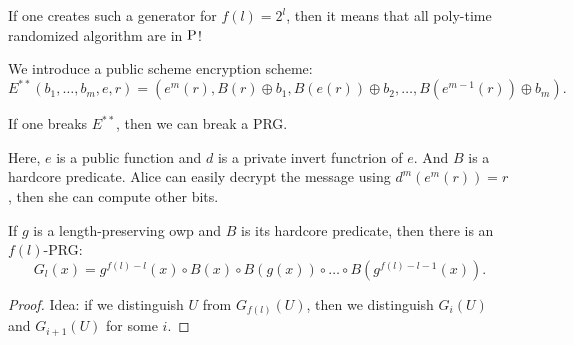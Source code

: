 If one creates such a generator for $f(l) = 2^{l}$, then it means that all poly-time randomized algorithm are in $\operatorname{P}$! 

We introduce a public scheme encryption scheme:
\[
E^{**}(b_1, \ldots, b_m, e, r) = (e^{m}(r), B(r) \oplus b_1, B(e(r)) \oplus b_2, \ldots, B(e^{m - 1}(r)) \oplus b_m).
\] 

\begin{theorem}
  If one breaks $E^{**}$, then we can break a PRG.
\end{theorem}

Here, $e$ is a public function and  $d$ is a private invert functrion of  $e$.
And $B$ is a hardcore predicate.
Alice can easily decrypt the message using $d^{m}(e^{m}(r)) = r$, then she can compute other bits.

\begin{lemma}
	If $g$ is a length-preserving owp and  $B$ is its hardcore predicate, then there is an  $f(l)$-PRG:
	 \[
	  G_l(x) = g^{f(l) - l}(x) \circ B(x) \circ B(g(x)) \circ \dots \circ B(g^{f(l) - l - 1}(x)).
	\] 
\end{lemma}
\begin{proof}
  Idea: if we distinguish $U$ from  $G_{f(l)}(U)$, then we distinguish  $G_i(U)$ and  $G_{i + 1}(U)$ for some $i$.

\end{proof}

